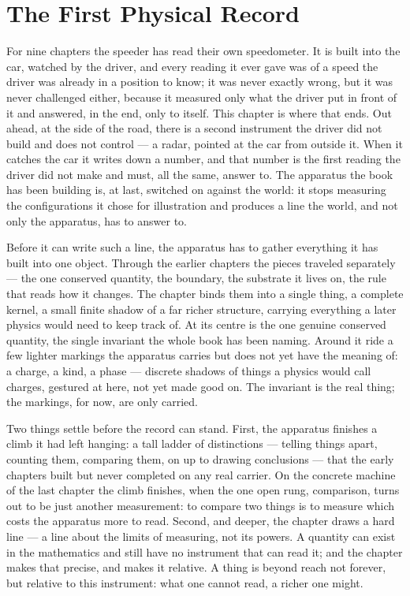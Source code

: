 \chapter{The First Physical Record}

For nine chapters the speeder has read their own speedometer. It is built into the car, watched by the driver, and every reading it ever gave was of a speed the driver was already in a position to know; it was never exactly wrong, but it was never challenged either, because it measured only what the driver put in front of it and answered, in the end, only to itself. This chapter is where that ends. Out ahead, at the side of the road, there is a second instrument the driver did not build and does not control --- a radar, pointed at the car from outside it. When it catches the car it writes down a number, and that number is the first reading the driver did not make and must, all the same, answer to. The apparatus the book has been building is, at last, switched on against the world: it stops measuring the configurations it chose for illustration and produces a line the world, and not only the apparatus, has to answer to.

Before it can write such a line, the apparatus has to gather everything it has built into one object. Through the earlier chapters the pieces traveled separately --- the one conserved quantity, the boundary, the substrate it lives on, the rule that reads how it changes. The chapter binds them into a single thing, a complete kernel, a small finite shadow of a far richer structure, carrying everything a later physics would need to keep track of. At its centre is the one genuine conserved quantity, the single invariant the whole book has been naming. Around it ride a few lighter markings the apparatus carries but does not yet have the meaning of: a charge, a kind, a phase --- discrete shadows of things a physics would call charges, gestured at here, not yet made good on. The invariant is the real thing; the markings, for now, are only carried.

Two things settle before the record can stand. First, the apparatus finishes a climb it had left hanging: a tall ladder of distinctions --- telling things apart, counting them, comparing them, on up to drawing conclusions --- that the early chapters built but never completed on any real carrier. On the concrete machine of the last chapter the climb finishes, when the one open rung, comparison, turns out to be just another measurement: to compare two things is to measure which costs the apparatus more to read. Second, and deeper, the chapter draws a hard line --- a line about the limits of measuring, not its powers. A quantity can exist in the mathematics and still have no instrument that can read it; and the chapter makes that precise, and makes it relative. A thing is beyond reach not forever, but relative to this instrument: what one cannot read, a richer one might.

